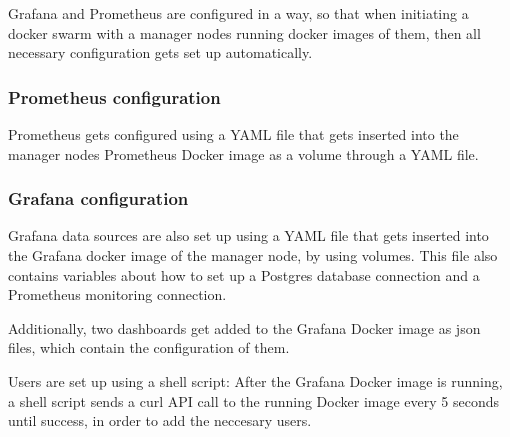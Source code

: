 Grafana and Prometheus are configured in a way, so that when initiating a docker swarm with a manager nodes running docker images of them, then all necessary configuration gets set up automatically.

\subsubsection{Prometheus configuration}

Prometheus gets configured using a YAML file that gets inserted into the manager nodes Prometheus Docker image as a volume through a YAML file.

\subsubsection{Grafana configuration}

Grafana data sources are also set up using a YAML file that gets inserted into the Grafana docker image of the manager node, by using volumes. This file also
contains variables about how to set up a Postgres database connection and a Prometheus monitoring connection.

Additionally, two dashboards get added to the Grafana Docker image as json files, which contain the configuration of them.

Users are set up using a shell script:
After the Grafana Docker image is running, a shell script sends a curl API call to the running Docker image every 5 seconds until success, in order to add the neccesary users.
